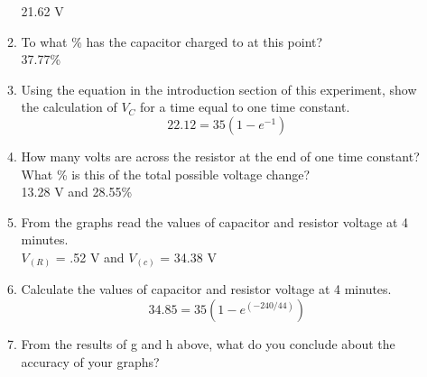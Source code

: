 \documentclass[a4paper]{article}
\begin{document}
\begin{enumerate}
\begin{enumerate}
        21.62 V
        \item To what \% has the capacitor charged to at this point? \\
        37.77\%
        \item Using the equation in the introduction section of this experiment, show the calculation of $V_{C}$ for a time equal to one time constant. \\
        \[22.12 = 35(1-e^{-1})\]
        \item How many volts are across the resistor at the end of one time constant? What \% is this of the total possible voltage change? \\
        13.28 V and 28.55\%
        \item From the graphs read the values of capacitor and resistor voltage at 4 minutes. \\
        $V_{(R)}$ = .52 V and $V_{(c)}$ = 34.38 V
        \item Calculate the values of capacitor and resistor voltage at 4 minutes. \\
        \[34.85 = 35(1-e^{(-240/44)})\]
        \item From the results of g and h above, what do you conclude about the accuracy of your graphs? \\
    \end{enumerate}
\end{enumerate}
\end{document}
